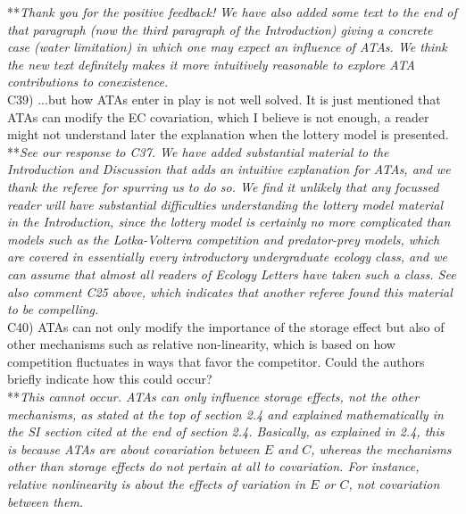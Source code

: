\documentclass[letterpaper,11pt]{article}
\begin{document}
\noindent ***\emph{Thank you for the positive feedback! We have also added some text to the end of that paragraph 
(now the third paragraph of the Introduction) giving a 
concrete case (water limitation) in which one may expect an influence of ATAs. We think the new text definitely
makes it more intuitively reasonable to explore ATA contributions to conexistence.} \\

\noindent C39) ...but how ATAs enter in play is not well solved. It is just mentioned that ATAs can modify the EC covariation, which I believe is not enough, a reader might not understand later the explanation when the lottery model is presented. \\

\noindent ***\emph{See our response to C37. We have added substantial material to the Introduction and Discussion that adds an
intuitive explanation for ATAs, and we thank the referee for spurring us to do so. 
We find it unlikely that any focussed reader will have substantial difficulties understanding the lottery model
material in the Introduction, since the lottery model is certainly no more complicated than models such as the Lotka-Volterra 
competition and predator-prey models, which are covered in essentially every introductory undergraduate ecology class, and we can assume
that almost all readers of Ecology Letters have taken such a class. See also comment C25 above, which indicates that another
referee found this material to be compelling.} \\

\noindent C40) ATAs can not only modify the importance of the storage effect but also of other mechanisms such as relative non-linearity, which is based on how competition fluctuates in ways that favor the competitor. Could the authors briefly indicate how this could occur? \\

\noindent ***\emph{This cannot occur. ATAs can only influence storage effects, not the other mechanisms, as stated at
the top of section 2.4 and explained mathematically in the SI section cited at the end of section 2.4. Basically, as explained in 2.4, 
this is because ATAs are about covariation between $E$ and $C$, whereas the mechanisms other than storage effects
do not pertain at all to covariation. For instance, relative nonlinearity is about the effects of variation 
in $E$ or $C$, not covariation between them.} \\
\end{document}

